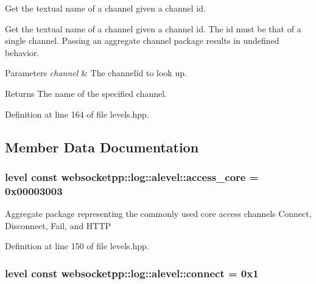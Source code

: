 Get the textual name of a channel given a channel id. 

Get the textual name of a channel given a channel id. The id must be that of a single channel. Passing an aggregate channel package results in undefined behavior.


\begin{DoxyParams}{Parameters}
{\em channel} & The channelid to look up.\\
\hline
\end{DoxyParams}
\begin{DoxyReturn}{Returns}
The name of the specified channel. 
\end{DoxyReturn}


Definition at line 164 of file levels.\+hpp.



\subsection{Member Data Documentation}
\subsubsection[{\texorpdfstring{access\+\_\+core}{access\_core}}]{\setlength{\rightskip}{0pt plus 5cm}level const websocketpp\+::log\+::alevel\+::access\+\_\+core = 0x00003003\hspace{0.3cm}{\ttfamily [static]}}\hypertarget{structwebsocketpp_1_1log_1_1alevel_af5fdb4de43a77cacb4c3a5b01b816750}{}\label{structwebsocketpp_1_1log_1_1alevel_af5fdb4de43a77cacb4c3a5b01b816750}
Aggregate package representing the commonly used core access channels Connect, Disconnect, Fail, and H\+T\+TP 

Definition at line 150 of file levels.\+hpp.

\subsubsection[{\texorpdfstring{connect}{connect}}]{\setlength{\rightskip}{0pt plus 5cm}level const websocketpp\+::log\+::alevel\+::connect = 0x1\hspace{0.3cm}{\ttfamily [static]}}\hypertarget{structwebsocketpp_1_1log_1_1alevel_aac3e16b6df297567ba2533233d477d57}{}\label{structwebsocketpp_1_1log_1_1alevel_aac3e16b6df297567ba2533233d477d57}


